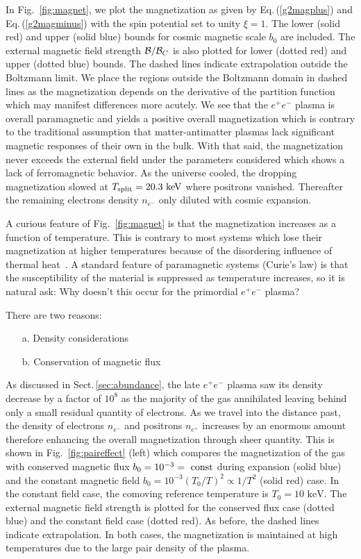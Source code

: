 \documentclass[a4paper]{article}
\newcommand*{\keV}{\text{ keV}}
\newcommand{\req}[1]{Eq.\,(\ref{#1})}
\newcommand{\rf}[1]{Fig.~{\ref{#1}}}
\newcommand{\rsec}[1]{Sect.\,{\ref{#1}}}
\begin{document}
In \rf{fig:magnet}, we plot the magnetization as given by \req{g2magplus} and \req{g2magminus} with the spin potential set to unity $\xi=1$. The lower (solid red) and upper (solid blue) bounds for cosmic magnetic scale $b_{0}$ are included. The external magnetic field strength ${\cal B}/{\cal B}_{C}$ is also plotted for lower (dotted red) and upper (dotted blue) bounds. The dashed lines indicate extrapolation outside the Boltzmann limit. We place the regions outside the Boltzmann domain in dashed lines as the magnetization depends on the derivative of the partition function which may manifest differences more acutely. We see that the $e^{+}e^{-}$ plasma is overall paramagnetic and yields a positive overall magnetization which is contrary to the traditional assumption that matter-antimatter plasmas lack significant magnetic responses of their own in the bulk. With that said, the magnetization never exceeds the external field under the parameters considered which shows a lack of ferromagnetic behavior. As the universe cooled, the dropping magnetization slowed at $T_{\rm split}=20.3\keV$ where positrons vanished. Thereafter the remaining electrons density $n_{e^{-}}$ only diluted with cosmic expansion.

A curious feature of \rf{fig:magnet} is that the magnetization increases as a function of temperature. This is contrary to most systems which lose their magnetization at higher temperatures because of the disordering influence of thermal heat~\cite{huang1991statistical}. A standard feature of paramagnetic systems (Curie's law) is that the susceptibility of the material is suppressed as temperature increases, so it is natural ask: Why doesn't this occur for the primordial $e^{+}e^{-}$ plasma?

There are two reasons:
\begin{itemize}
    \item[a.] Density considerations
    \item[b.] Conservation of magnetic flux
\end{itemize}

 As discussed in \rsec{sec:abundance}, the late $e^{+}e^{-}$ plasma saw its density decrease by a factor of $10^{8}$ as the majority of the gas annihilated leaving behind only a small residual quantity of electrons. As we travel into the distance past, the density of electrons $n_{e^{-}}$ and positrons $n_{e^{+}}$ increases by an enormous amount therefore enhancing the overall magnetization through sheer quantity. This is shown in \rf{fig:paireffect} (left) which compares the magnetization of the gas with conserved magnetic flux $b_{0}=10^{-3}={\rm\ const}$ during expansion (solid blue) and the constant magnetic field $b_{0}=10^{-3}(T_{0}/T)^{2}\propto1/T^{2}$ (solid red) case. In the constant field case, the comoving reference temperature is $T_{0}=10\keV$. The external magnetic field strength is plotted for the conserved flux case (dotted blue) and the constant field case (dotted red). As before, the dashed lines indicate extrapolation. In both cases, the magnetization is maintained at high temperatures due to the large pair density of the plasma.
\end{document}
